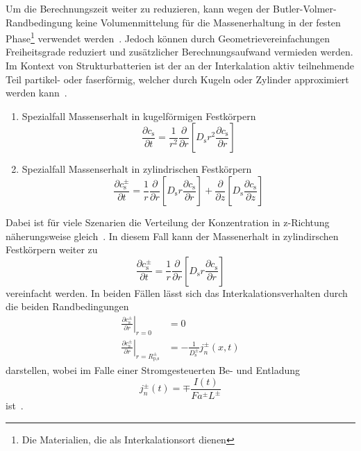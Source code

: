 Um die Berechnungszeit weiter zu reduzieren, kann wegen der Butler-Volmer-Randbedingung keine Volumenmittelung für die Massenerhaltung in der festen Phase\footnote{Die Materialien, die als Interkalationsort dienen} verwendet werden~\cite{Plett2015}. Jedoch können durch Geometrievereinfachungen Freiheitsgrade reduziert und zusätzlicher Berechnungsaufwand vermieden werden. Im Kontext von Strukturbatterien ist der an der Interkalation aktiv teilnehmende Teil partikel- oder faserförmig, welcher durch Kugeln oder Zylinder approximiert werden kann~\cite{Newman2021}.
\begin{enumerate}
    \item Spezialfall Massenserhalt in kugelförmigen Festkörpern
    \begin{equation}
    \frac{\partial c_{\text{s}}}{\partial t} = \frac{1}{r^2} \frac{\partial}{ \partial r} \left[ D_{\text{s}} r^2 \frac{\partial c_{\text{s}}}{\partial r}\right]
    \end{equation}
    \item Spezialfall Massenserhalt in zylindrischen Festkörpern
    \begin{equation}
    \frac{\partial c_{\text{s}}^{\pm}}{\partial t} = \frac{1}{r} \frac{\partial}{ \partial r} \left[ D_{\text{s}} r \frac{\partial c_{\text{s}}}{\partial r}\right] + \frac{\partial}{ \partial z}\left[D_{\text{s}}  \frac{\partial c_{\text{s}}}{\partial z}\right]
    \end{equation}
\end{enumerate}
Dabei ist für viele Szenarien die Verteilung der Konzentration in z-Richtung näherungsweise gleich~\cite{Wang2020c}. In diesem Fall kann der Massenerhalt in zylindirschen Festkörpern weiter zu 
\begin{equation}
    \frac{\partial c_{\text{s}}^{\pm}}{\partial t} = \frac{1}{r} \frac{\partial}{ \partial r} \left[ D_{\text{s}} r \frac{\partial c_{\text{s}}}{\partial r}\right]
\end{equation}
vereinfacht werden.
In beiden Fällen lässt sich das Interkalationsverhalten durch die beiden Randbedingungen
\begin{align}
    \left.\frac{\partial c_{\text{s}}^{\pm}}{\partial r}\right\vert_{r=0} &= 0 \\
    \left.\frac{\partial c_{\text{s}}^{\pm}}{\partial r}\right\vert_{r=R_{\text{p,s}}^{\pm}} &= -\frac{1}{ D_{\text{s}}^\pm} j_{n}^{\pm}(x,t)
\end{align}
darstellen, wobei im Falle einer Stromgesteuerten Be- und Entladung
\begin{equation}
j_{n}^{\pm}(t) = \mp \frac{I(t)}{F a^{\pm} L^{\pm}}
\end{equation}
ist~\cite{Plett2015}.

